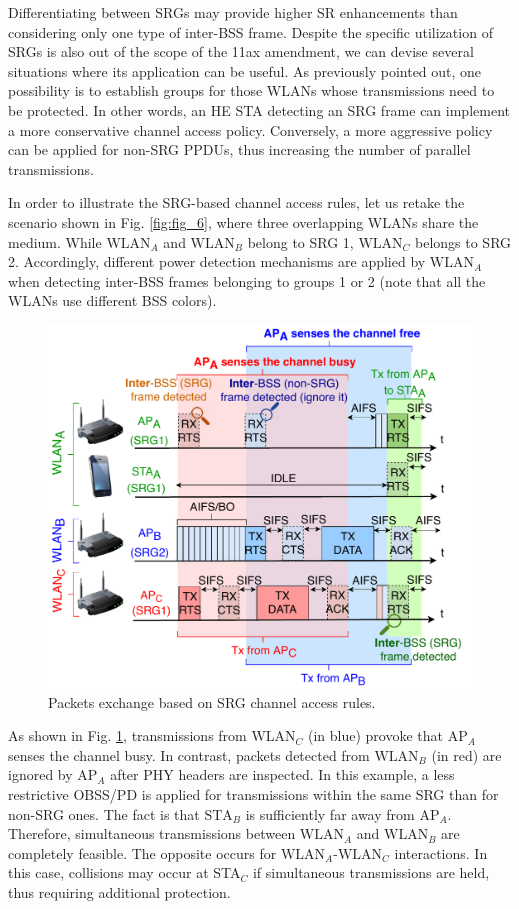 \documentclass[preprint,12pt]{elsarticle}
\begin{document}
	Differentiating between SRGs may provide higher SR enhancements than considering only one type of inter-BSS frame. Despite the specific utilization of SRGs is also out of the scope of the 11ax amendment, we can devise several situations where its application can be useful. As previously pointed out, one possibility is to establish groups for those WLANs whose transmissions need to be protected. In other words, an HE STA detecting an SRG frame can implement a more conservative channel access policy. Conversely, a more aggressive policy can be applied for non-SRG PPDUs, thus increasing the number of parallel transmissions. 
	
	In order to illustrate the SRG-based channel access rules, let us retake the scenario shown in Fig. \ref{fig:fig_6}, where three overlapping WLANs share the medium. While $\text{WLAN}_A$ and $\text{WLAN}_B$ belong to SRG 1, $\text{WLAN}_C$ belongs to SRG 2. Accordingly, different power detection mechanisms are applied by $\text{WLAN}_A$ when detecting inter-BSS frames belonging to groups 1 or 2 (note that all the WLANs use different BSS colors).
	
	\begin{figure}[ht!]
		\centering
		\includegraphics[width=0.45\columnwidth]{fig_7}
		\caption{Packets exchange based on SRG channel access rules.}
		\label{fig:srg_channel_access}
	\end{figure} 
	
	As shown in Fig. \ref{fig:srg_channel_access}, transmissions from $\text{WLAN}_C$ (in blue) provoke that $\text{AP}_A$ senses the channel busy. In contrast, packets detected from $\text{WLAN}_B$ (in red) are ignored by $\text{AP}_A$ after PHY headers are inspected. In this example, a less restrictive OBSS/PD is applied for transmissions within the same SRG than for non-SRG ones. The fact is that $\text{STA}_B$ is sufficiently far away from $\text{AP}_A$. Therefore, simultaneous transmissions between $\text{WLAN}_A$ and $\text{WLAN}_B$ are completely feasible. The opposite occurs for $\text{WLAN}_A$-$\text{WLAN}_C$ interactions. In this case, collisions may occur at STA$_C$ if simultaneous transmissions are held, thus requiring additional protection.
	
\end{document}

